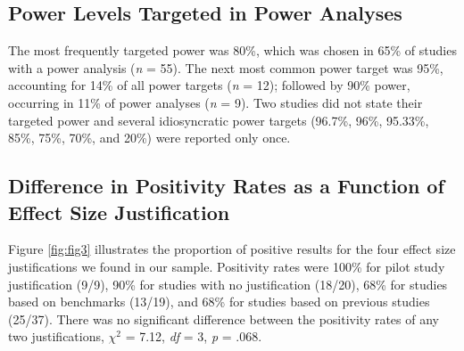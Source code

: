 \documentclass[
  man, donotrepeattitle,mask,floatsintext]{apa7}
\begin{document}
\hypertarget{power-levels-targeted-in-power-analyses}{%
\subsection{Power Levels Targeted in Power Analyses}\label{power-levels-targeted-in-power-analyses}}

The most frequently targeted power was 80\%, which was chosen in 65\% of studies with a power analysis (\emph{n} = 55). The next most common power target was 95\%, accounting for 14\% of all power targets (\emph{n} = 12); followed by 90\% power, occurring in 11\% of power analyses (\emph{n} = 9). Two studies did not state their targeted power and several idiosyncratic power targets (96.7\%, 96\%, 95.33\%, 85\%, 75\%, 70\%, and 20\%) were reported only once.

\hypertarget{difference-in-positivity-rates-as-a-function-of-effect-size-justification}{%
\subsection{Difference in Positivity Rates as a Function of Effect Size Justification}\label{difference-in-positivity-rates-as-a-function-of-effect-size-justification}}

Figure \ref{fig:fig3} illustrates the proportion of positive results for the four effect size justifications we found in our sample. Positivity rates were 100\% for pilot study justification (9/9), 90\% for studies with no justification (18/20), 68\% for studies based on benchmarks (13/19), and 68\% for studies based on previous studies (25/37). There was no significant difference between the positivity rates of any two justifications, \(\chi^2\) = 7.12, \emph{df} = 3, \emph{p} = .068.

\pagebreak
\end{document}
